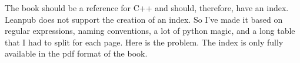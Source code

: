 The book should be a reference for C++ and should, therefore, have an index. Leanpub does not support the creation of an index. So I’ve made it based on regular expressions, naming conventions, a lot of python magic, and a long table that I had to split for each page. Here is the problem. The index is only fully available in the pdf format of the book.